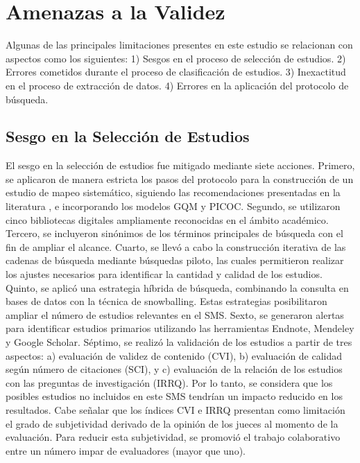 \section{Amenazas a la Validez}\label{sec:amenazas-validez}
Algunas de las principales limitaciones presentes en este estudio se relacionan con aspectos como los siguientes: 1) Sesgos en el proceso de selección de estudios. 2) Errores cometidos durante el proceso de clasificación de estudios. 3) Inexactitud en el proceso de extracción de datos. 4) Errores en la aplicación del protocolo de búsqueda.


\subsection{Sesgo en la Selección de Estudios}
El sesgo en la selección de estudios fue mitigado mediante siete acciones.
Primero, se aplicaron de manera estricta los pasos del protocolo para la construcción de un estudio de mapeo sistemático, siguiendo las recomendaciones presentadas en la literatura \cite{Kitchenham2010792, budgen2008using}, e incorporando los modelos GQM y PICOC. Segundo, se utilizaron cinco bibliotecas digitales ampliamente reconocidas en el ámbito académico. Tercero, se incluyeron sinónimos de los términos principales de búsqueda con el fin de ampliar el alcance. Cuarto, se llevó a cabo la construcción iterativa de las cadenas de búsqueda mediante búsquedas piloto, las cuales permitieron realizar los ajustes necesarios para identificar la cantidad y calidad de los estudios. Quinto, se aplicó una estrategia híbrida de búsqueda, combinando la consulta en bases de datos con la técnica de snowballing. Estas estrategias posibilitaron ampliar el número de estudios relevantes en el SMS. Sexto, se generaron alertas para identificar estudios primarios utilizando las herramientas Endnote, Mendeley y Google Scholar. Séptimo, se realizó la validación de los estudios a partir de tres aspectos: a) evaluación de validez de contenido (CVI), b) evaluación de calidad según número de citaciones (SCI), y c) evaluación de la relación de los estudios con las preguntas de investigación (IRRQ). Por lo tanto, se considera que los posibles estudios no incluidos en este SMS tendrían un impacto reducido en los resultados. Cabe señalar que los índices CVI e IRRQ presentan como limitación el grado de subjetividad derivado de la opinión de los jueces al momento de la evaluación. Para reducir esta subjetividad, se promovió el trabajo colaborativo entre un número impar de evaluadores (mayor que uno).


